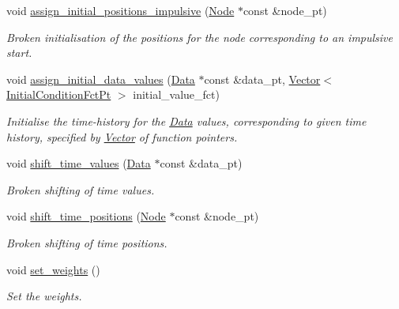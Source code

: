 \begin{DoxyCompactItemize}
void \hyperlink{classoomph_1_1PeriodicOrbitTimeDiscretisation_ab0445858504afb534970431e8bf2d3c6}{assign\+\_\+initial\+\_\+positions\+\_\+impulsive} (\hyperlink{classoomph_1_1Node}{Node} $\ast$const \&node\+\_\+pt)
\begin{DoxyCompactList}\small\item\em Broken initialisation of the positions for the node corresponding to an impulsive start. \end{DoxyCompactList}\item 
void \hyperlink{classoomph_1_1PeriodicOrbitTimeDiscretisation_abdbc5908a5f202d6ecf37fd1a1431292}{assign\+\_\+initial\+\_\+data\+\_\+values} (\hyperlink{classoomph_1_1Data}{Data} $\ast$const \&data\+\_\+pt, \hyperlink{classoomph_1_1Vector}{Vector}$<$ \hyperlink{classoomph_1_1PeriodicOrbitTimeDiscretisation_a0bccd8d239689d95cf7422d877a5eed8}{Initial\+Condition\+Fct\+Pt} $>$ initial\+\_\+value\+\_\+fct)
\begin{DoxyCompactList}\small\item\em Initialise the time-\/history for the \hyperlink{classoomph_1_1Data}{Data} values, corresponding to given time history, specified by \hyperlink{classoomph_1_1Vector}{Vector} of function pointers. \end{DoxyCompactList}\item 
void \hyperlink{classoomph_1_1PeriodicOrbitTimeDiscretisation_a6893d2c1436831d5ad635b43bd91f42e}{shift\+\_\+time\+\_\+values} (\hyperlink{classoomph_1_1Data}{Data} $\ast$const \&data\+\_\+pt)
\begin{DoxyCompactList}\small\item\em Broken shifting of time values. \end{DoxyCompactList}\item 
void \hyperlink{classoomph_1_1PeriodicOrbitTimeDiscretisation_a246a40f0cfe0ebc3d5020ede92a2d0e9}{shift\+\_\+time\+\_\+positions} (\hyperlink{classoomph_1_1Node}{Node} $\ast$const \&node\+\_\+pt)
\begin{DoxyCompactList}\small\item\em Broken shifting of time positions. \end{DoxyCompactList}\item 
void \hyperlink{classoomph_1_1PeriodicOrbitTimeDiscretisation_a250509cf3fb767dc65b14b8dea9ea1e8}{set\+\_\+weights} ()
\begin{DoxyCompactList}\small\item\em Set the weights. \end{DoxyCompactList}\item 

\end{DoxyCompactItemize}
